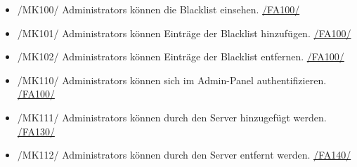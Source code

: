 \begin{itemize}
\begin{itemize}
            \item{/MK92/} \label{/MK92/}Auf welcher Etage befindet sich der Raum? \hyperref[/FA20/]{/FA20/}
            \item{/MK93/} \label{/MK93/}Welche Nummer hat der Raum? \hyperref[/FA20/]{/FA20/}
            \item{/MK94/} \label{/MK94/}Welche \Glspl{Alias} hat das Gebäude/der Raum? \hyperref[/FA80/]{/FA80/}
        \end{itemize}
    \item{/MK100/} \label{/MK100/}\Glspl{Administrator} können die \Gls{Blacklist} einsehen. \hyperref[/FA100/]{/FA100/}
    \item{/MK101/} \label{/MK101/}\Glspl{Administrator} können Einträge der \Gls{Blacklist} hinzufügen. \hyperref[/FA100/]{/FA100/}
    \item{/MK102/} \label{/MK102/}\Glspl{Administrator} können Einträge der \Gls{Blacklist} entfernen. \hyperref[/FA100/]{/FA100/}
    \item{/MK110/} \label{/MK110/}\Glspl{Administrator} können sich im \Gls{Admin-Panel} authentifizieren. \hyperref[/FA100/]{/FA100/}
    \item{/MK111/} \label{/MK111/}\Glspl{Administrator} können durch den \Gls{Server} hinzugefügt werden. \hyperref[/FA130/]{/FA130/}
    \item{/MK112/} \label{/MK112/}\Glspl{Administrator} können durch den \Gls{Server} entfernt werden. \hyperref[/FA140/]{/FA140/}

\end{itemize}
